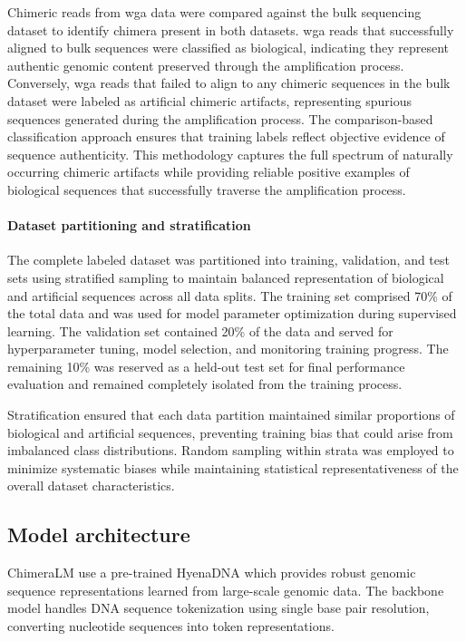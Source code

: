 \documentclass[pdflatex,sn-nature]{sn-jnl}%
\theoremstyle{thmstyleone}%
\theoremstyle{thmstyletwo}%
\theoremstyle{thmstylethree}%
\begin{document}
Chimeric reads from \gls{wga} data were compared against the bulk sequencing dataset to identify chimera present in both datasets.
\gls{wga} reads that successfully aligned to bulk sequences were classified as biological, indicating they represent authentic genomic content preserved through the amplification process.
Conversely, \gls{wga} reads that failed to align to any chimeric sequences in the bulk dataset were labeled as artificial chimeric artifacts, representing spurious sequences generated during the amplification process.
The comparison-based classification approach ensures that training labels reflect objective evidence of sequence authenticity.
This methodology captures the full spectrum of naturally occurring chimeric artifacts while providing reliable positive examples of biological sequences that successfully traverse the amplification process.

\paragraph{Dataset partitioning and stratification}
The complete labeled dataset was partitioned into training, validation, and test sets using stratified sampling to maintain balanced representation of biological and artificial sequences across all data splits.
The training set comprised 70\% of the total data and was used for model parameter optimization during supervised learning.
The validation set contained 20\% of the data and served for hyperparameter tuning, model selection, and monitoring training progress.
The remaining 10\% was reserved as a held-out test set for final performance evaluation and remained completely isolated from the training process.

Stratification ensured that each data partition maintained similar proportions of biological and artificial sequences, preventing training bias that could arise from imbalanced class distributions. Random sampling within strata was employed to minimize systematic biases while maintaining statistical representativeness of the overall dataset characteristics.

\subsection*{Model architecture}

ChimeraLM use a pre-trained HyenaDNA which provides robust genomic sequence representations learned from large-scale genomic data.
The backbone model handles DNA sequence tokenization using single base pair resolution, converting nucleotide sequences into token representations.
\end{document}
